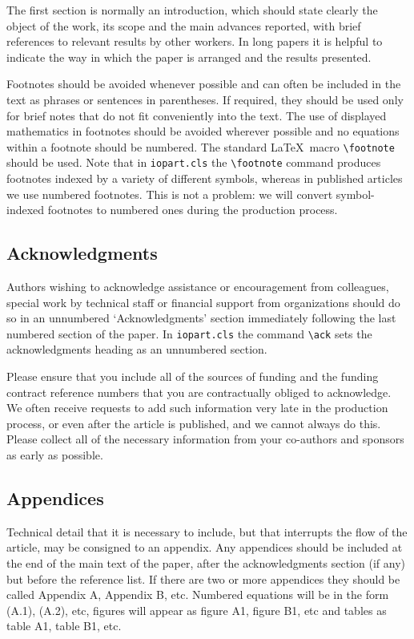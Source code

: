 \documentclass[12pt]{iopart}
\begin{document}
The first section is normally an introduction,  which should state clearly 
the object of the work, its scope and the main advances reported, with 
brief references to relevant results by other workers. In long papers it is 
helpful to indicate the way in which the paper is arranged and the results 
presented.

Footnotes should be avoided whenever possible and can often be included in the text as phrases or sentences in parentheses. If required, they should be used only for brief notes that do not fit conveniently into the text. The use of 
displayed mathematics in footnotes should be avoided wherever possible and no equations within a footnote should be numbered. 
The standard \LaTeX\ macro \verb"\footnote" should be used.  Note that in \verb"iopart.cls" the \verb"\footnote" command
produces footnotes indexed by a variety of different symbols,
whereas in published articles we use numbered footnotes.  This
is not a problem: we will convert symbol-indexed footnotes to numbered ones during the production process.

\subsection{Acknowledgments}
Authors wishing to acknowledge assistance or encouragement from 
colleagues, special work by technical staff or financial support from 
organizations should do so in an unnumbered `Acknowledgments' section 
immediately following the last numbered section of the paper. In \verb"iopart.cls" the 
command \verb"\ack" sets the acknowledgments heading as an unnumbered
section.

Please ensure that you include all of the sources of funding and the funding contract reference numbers that you are contractually obliged to acknowledge. We often receive requests to add such information very late in the production process, or even after the article is published, and we cannot always do this. Please collect all of the necessary information from your co-authors and sponsors as early as possible.  

\subsection{Appendices}
Technical detail that it is necessary to include, but that interrupts 
the flow of the article, may be consigned to an appendix. 
Any appendices should be included at the end of the main text of the paper, after the acknowledgments section (if any) but before the reference list.
If there are 
two or more appendices they should be called Appendix A, Appendix B, etc. 
Numbered equations will be in the form (A.1), (A.2), etc,
figures will appear as figure A1, figure B1, etc and tables as table A1,
table B1, etc.
\end{document}
